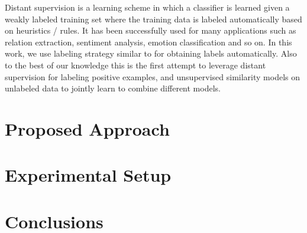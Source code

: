 \documentclass{sig-alternate-05-2015}
\begin{document}
Distant supervision is a learning scheme in which a classifier is learned given a weakly labeled training set where the training data is labeled automatically based on heuristics / rules. It has been successfully used for many applications such as relation extraction, sentiment analysis, emotion classification and so on. In this work, we use labeling strategy similar to  \cite{hachenbergfinding}  for obtaining labels  automatically. Also to the best of our knowledge this is the first attempt to leverage distant supervision for labeling positive examples, and unsupervised similarity models on unlabeled data to jointly learn to combine different models.

\section{Proposed Approach}


\section{Experimental Setup}
\section{Conclusions}

  
\end{document}
